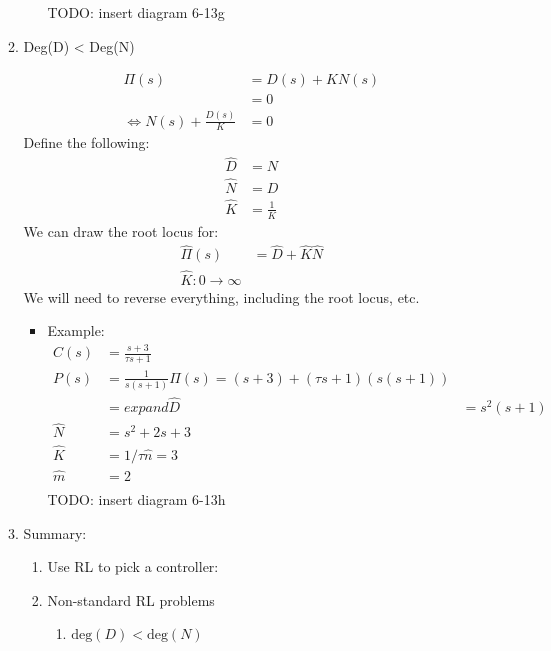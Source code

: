 \begin{enumerate}
\begin{enumerate}
\begin{itemize}
                        TODO: insert diagram 6-13g
                \end{itemize}

            \item Deg(D) < Deg(N)

                \begin{align*}
                    \Pi(s) &= D(s) + K N(s) \\
                    &= 0 \\
                    \Longleftrightarrow N(s) + \frac{D(s)}{K} &= 0
                \end{align*}
                Define the following:
                \begin{align*}
                    \hat{D} &= N \\
                    \hat{N} &= D \\
                    \hat{K} &= \frac{1}{K}
                \end{align*}
                We can draw the root locus for:
                \begin{align*}
                    \hat{\Pi}(s) &= \hat{D} + \hat{K} \hat{N} \\
                    \hat{K} : 0 \to \infty
                \end{align*}
                We will need to reverse everything, including the root locus, etc.
                \begin{itemize}
                    \item Example:
                        \begin{align*}
                            C(s) &= \frac{s+3}{\tau s + 1} \\
                            P(s) &= \frac{1}{s(s+1)}
                            \Pi(s) = (s+3) + (\tau s + 1) (s(s+1)) \\
                            &= expand
                            \hat{D} &= s^2 (s+1) \\
                            \hat{N} &= s^2 + 2s + 3 \\
                            \hat{K} &= 1/\tau
                            \hat{n} = 3 \\
                            \hat{m} &= 2 \\
                        \end{align*}
                    TODO: insert diagram 6-13h

                \end{itemize}
            \item Summary:
                \begin{enumerate}
                    \item Use RL to pick a controller:
                    \item Non-standard RL problems
                        \begin{enumerate}
                            \item $\text{deg}(D) < \text{deg}(N)$


\end{enumerate}
\end{enumerate}
\end{enumerate}
\end{enumerate}
